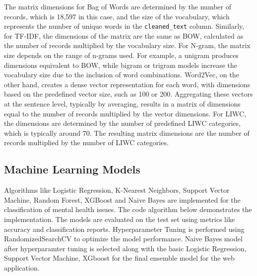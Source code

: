 \noindent
The matrix dimensions for Bag of Words are determined by the number of records, which is 18,597 in this case, and the size of the vocabulary, which represents the number of unique words in the \texttt{cleaned\_text} column. Similarly, for TF-IDF, the dimensions of the matrix are the same as BOW, calculated as the number of records multiplied by the vocabulary size. For N-gram, the matrix size depends on the range of n-grams used. For example, a unigram produces dimensions equivalent to BOW, while bigram or trigram models increase the vocabulary size due to the inclusion of word combinations. Word2Vec, on the other hand, creates a dense vector representation for each word, with dimensions based on the predefined vector size, such as 100 or 200. Aggregating these vectors at the sentence level, typically by averaging, results in a matrix of dimensions equal to the number of records multiplied by the vector dimensions. For LIWC, the dimensions are determined by the number of predefined LIWC categories, which is typically around 70. The resulting matrix dimensions are the number of records multiplied by the number of LIWC categories.


\subsection{Machine Learning Models}

Algorithms like Logistic Regression, K-Nearest Neighbors, Support Vector Machine, Random Forest, XGBoost and Naive Bayes are implemented for the classification of mental health issues. The code algorithm below demonstrates the implementation. The models are evaluated on the test set using metrics like accuracy and classification reports. Hyperparameter Tuning is performed using RandomizedSearchCV to optimize the model performance. Naive Bayes model after hyperparamter tuning is selected along with the basic Logistic Regression, Support Vector Machine, XGboost for the final ensemble model for the web application. 

